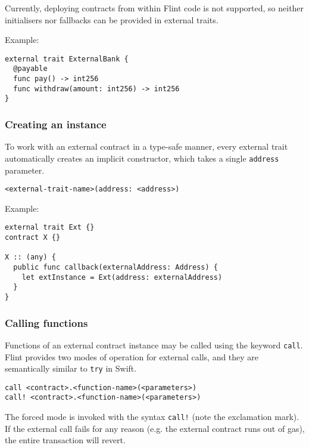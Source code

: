 Currently, deploying contracts from within Flint code is not supported, so neither initialisers nor fallbacks can be provided in external traits.

Example:

\begin{verbatim}
external trait ExternalBank {
  @payable
  func pay() -> int256
  func withdraw(amount: int256) -> int256
}
\end{verbatim}

\subsubsection{Creating an instance}
\label{sec:appendix-b-creating-an-instance}

To work with an external contract in a type-safe manner, every external trait automatically creates an implicit constructor, which takes a single \texttt{address} parameter.

\begin{verbatim}
<external-trait-name>(address: <address>)
\end{verbatim}

Example:

\begin{verbatim}
external trait Ext {}
contract X {}

X :: (any) {
  public func callback(externalAddress: Address) {
    let extInstance = Ext(address: externalAddress)
  }
}
\end{verbatim}

\subsubsection{Calling functions}
\label{sec:appendix-b-calling-functions}

Functions of an external contract instance may be called using the keyword \texttt{call}. Flint provides two modes of operation for external calls, and they are semantically similar to \texttt{try} in Swift.

\begin{verbatim}
call <contract>.<function-name>(<parameters>)
call! <contract>.<function-name>(<parameters>)
\end{verbatim}

The forced mode is invoked with the syntax \texttt{call!} (note the exclamation mark). If the external call fails for any reason (e.g. the external contract runs out of gas), the entire transaction will revert.

